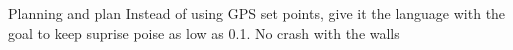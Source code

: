 \begin{frame}{Planning and plan}
    Instead of using GPS set points, give it the language with the goal to keep suprise poise as low as 0.1. No crash with the walls
\end{frame}